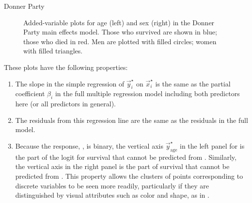 \documentclass[11pt]{book}\usepackage[]{graphicx}\usepackage[]{color}
\newenvironment{knitrout}{}{} %
\renewenvironment{knitrout}{\small\renewcommand{\baselinestretch}{.85}}{} %
\begin{document}
\begin{Example}[donner4]{Donner Party}
\begin{knitrout}
\begin{figure}[!htbp]
\caption[Added-variable plots for age (left) and sex (right) in the Donner Party main effects model]{Added-variable plots for age (left) and sex (right) in the Donner Party main effects model. Those who survived are shown in blue; those who died in red. Men are plotted with filled circles; women with filled triangles. \label{fig:donner4-avp}}
\end{figure}


\end{knitrout}

These plots have the following properties:
\begin{enumerate}

\item The slope in the simple regression of $\vec{y}_i^\star$ on $\vec{x}_i^\star$
is the same as the partial coefficient $\beta_i$ in the full multiple regression model including
both predictors here (or all predictors in general).

\item The residuals from this regression line are the same as the residuals in the full model.

\item Because the response, , is binary, the vertical axis
$\vec{y}_{\mathrm{age}}^\star$ in the left panel for  is the part of the logit for
survival that cannot be predicted from .  Similarly, the vertical axis in the
right panel is the part of survival that cannot be predicted from .
This property allows the clusters of points corresponding to discrete variables to be
seen more readily, particularly if they are distinguished by visual attributes such
as color and shape, as in .

\end{enumerate}


\end{Example}
\end{document}

